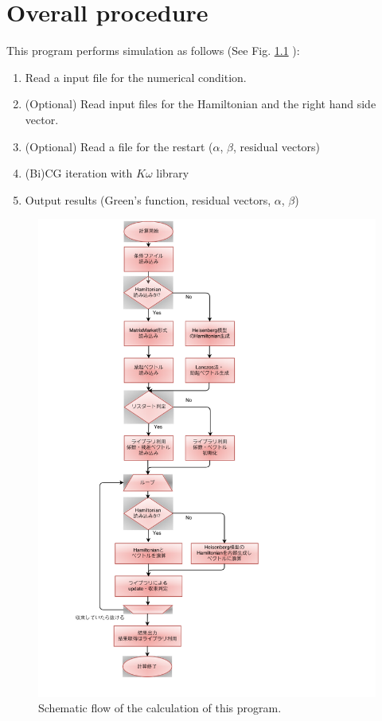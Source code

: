 \documentclass[letterpaper,10pt,dvipdfmx,openany]{sphinxmanual}
\begin{document}
\chapter{Overall procedure}
\label{shiftk_flow_en:overall-procedure}\label{shiftk_flow_en::doc}
This program performs simulation as follows (See Fig. \ref{shiftk_flow_en:calcflow} ):
\begin{enumerate}
\item {} 
Read a input file for the numerical condition.

\item {} 
(Optional) Read input files for the Hamiltonian and the right hand side vector.

\item {} 
(Optional) Read a file for the restart (\(\alpha\), \(\beta\), residual vectors)

\item {} 
(Bi)CG iteration with \(K\omega\) library

\item {} 
Output results (Green's function, residual vectors, \(\alpha\), \(\beta\))

\end{enumerate}
\begin{figure}[htbp]
\centering
\capstart

\includegraphics{flow.png}
\caption{Schematic flow of the calculation of this program.}\label{shiftk_flow_en:calcflow}\end{figure}
\end{document}
